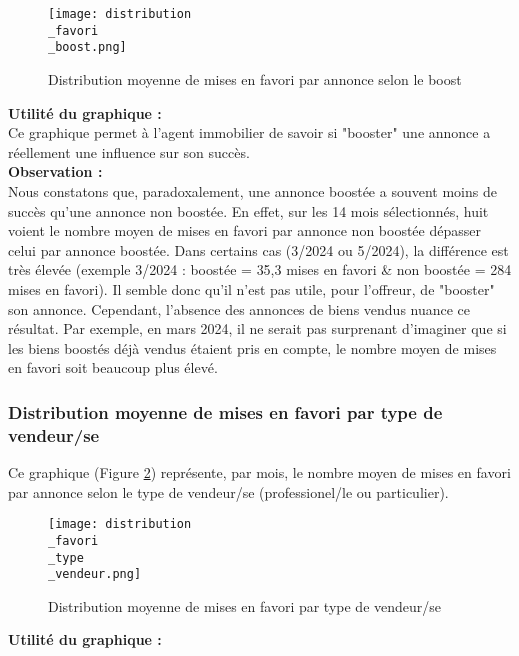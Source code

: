 \documentclass[a4paper, 12pt, twoside]{report}
\begin{document}
			\begin{figure}[h]
				\centering
				\texttt{[image: distribution\\\_favori\\\_boost.png]}
				\caption{Distribution moyenne de mises en favori par annonce selon le boost}
				\label{distributionFavoriBoost}
			\end{figure}	

			{\bf Utilité du graphique :} \\

			Ce graphique permet à l'agent immobilier de savoir si "booster" une annonce a réellement une influence sur son succès. \\

			{\bf Observation :} \\
			
			Nous constatons que, paradoxalement, une annonce boostée a souvent moins de succès qu'une annonce non boostée. En effet, sur les 14 mois sélectionnés, huit voient le nombre moyen de mises en favori par annonce non boostée dépasser celui par annonce boostée. Dans certains cas (3/2024 ou 5/2024), la différence est très élevée (exemple 3/2024 : boostée = 35,3 mises en favori \& non boostée = 284 mises en favori). Il semble donc qu'il n'est pas utile, pour l'offreur, de "booster" son annonce. Cependant, l'absence des annonces de biens vendus nuance ce résultat. Par exemple, en mars 2024, il ne serait pas surprenant d'imaginer que si les biens boostés déjà vendus étaient pris en compte, le nombre moyen de mises en favori soit beaucoup plus élevé.

			\subsubsection{Distribution moyenne de mises en favori par type de vendeur/se}

			Ce graphique (Figure \ref{distributionFavoriTypeVendeur}) représente, par mois, le nombre moyen de mises en favori par annonce selon le type de vendeur/se (professionel/le ou particulier). \\

			\begin{figure}[h]
				\centering
				\texttt{[image: distribution\\\_favori\\\_type\\\_vendeur.png]}
				\caption{Distribution moyenne de mises en favori par type de vendeur/se}
				\label{distributionFavoriTypeVendeur}
			\end{figure}	

			{\bf Utilité du graphique :} \\
\end{document}
